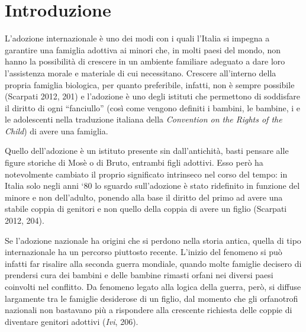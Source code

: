 \documentclass[12pt,oneside,svgnames]{memoir}
\author{}
\date{}
\begin{document}

\addtocounter{page}{-1} %
\null
\thispagestyle{empty}%
\addtocounter{page}{-1}%
\newpage

{
\hypersetup{linkcolor=black}
\setcounter{tocdepth}{2}
\tableofcontents
}
\chapter{Introduzione}\label{introduzione}

\parskip0pt

L'adozione internazionale è uno dei modi con i quali l'Italia si impegna
a garantire una famiglia adottiva ai minori che, in molti paesi del
mondo, non hanno la possibilità di crescere in un ambiente familiare
adeguato a dare loro l'assistenza morale e materiale di cui necessitano.
Crescere all'interno della propria famiglia biologica, per quanto
preferibile, infatti, non è sempre possibile (Scarpati 2012, 201) e
l'adozione è uno degli istituti che permettono di soddisfare il diritto
di ogni ``fanciullo'' (così come vengono definiti i bambini, le bambine,
i e le adolescenti nella traduzione italiana della \emph{Convention on
the Rights of the Child}) di avere una famiglia.

Quello dell'adozione è un istituto presente sin dall'antichità, basti
pensare alle figure storiche di Mosè o di Bruto, entrambi figli
adottivi. Esso però ha notevolmente cambiato il proprio significato
intrinseco nel corso del tempo: in Italia solo negli anni `80 lo sguardo
sull'adozione è stato ridefinito in funzione del minore e non
dell'adulto, ponendo alla base il diritto del primo ad avere una stabile
coppia di genitori e non quello della coppia di avere un figlio
(Scarpati 2012, 204).

Se l'adozione nazionale ha origini che si perdono nella storia antica,
quella di tipo internazionale ha un percorso piuttosto recente. L'inizio
del fenomeno si può infatti far risalire alla seconda guerra mondiale,
quando molte famiglie decisero di prendersi cura dei bambini e delle
bambine rimasti orfani nei diversi paesi coinvolti nel conflitto. Da
fenomeno legato alla logica della guerra, però, si diffuse largamente
tra le famiglie desiderose di un figlio, dal momento che gli orfanotrofi
nazionali non bastavano più a rispondere alla crescente richiesta delle
coppie di diventare genitori adottivi (\emph{Ivi}, 206).
\end{document}

